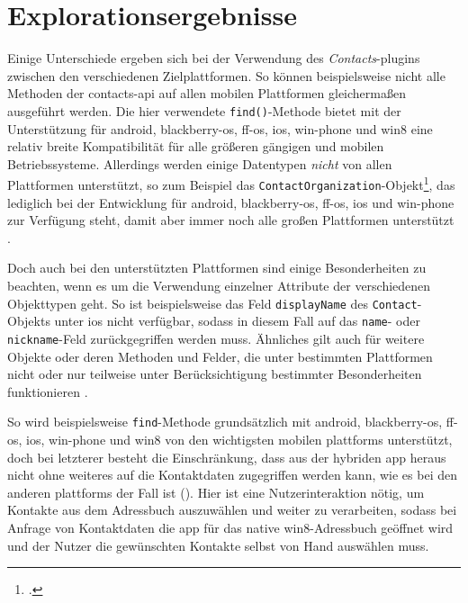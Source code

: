 	\pagebreak
	
\section{Explorationsergebnisse} \label{sec:contacts-ergebnis}
Einige Unterschiede ergeben sich bei der Verwendung des \emph{Contacts}-\glspl{plugin} zwischen den verschiedenen Zielplattformen.
So können beispielsweise nicht alle Methoden der \gls{contacts-api} auf allen mobilen Plattformen gleichermaßen ausgeführt werden.
Die hier verwendete \lstinline|find()|-Methode bietet mit der Unterstützung für \gls{android}, \gls{blackberry-os}, \gls{ff-os}, \gls{ios}, \gls{win-phone} und \gls{win8} eine relativ  breite Kompatibilität für alle größeren gängigen und mobilen Betriebssysteme.
Allerdings werden einige Datentypen \emph{nicht} von allen Plattformen unterstützt, so zum Beispiel das \lstinline|ContactOrganization|-Objekt\footnote{.}, das lediglich bei der Entwicklung für \gls{android}, \gls{blackberry-os}, \gls{ff-os}, \gls{ios} und \gls{win-phone} zur Verfügung steht, damit aber immer noch alle großen Plattformen unterstützt \cite{Cordova_Plugin_Registry_Contacts}.

Doch auch bei den unterstützten Plattformen sind einige Besonderheiten zu beachten, wenn es um die Verwendung einzelner Attribute der verschiedenen Objekttypen geht.
So ist beispielsweise das Feld \lstinline|displayName| des \lstinline|Contact|-Objekts unter \gls{ios} nicht verfügbar, sodass in diesem Fall auf das \lstinline|name|- oder \lstinline|nickname|-Feld zurückgegriffen werden muss.
Ähnliches gilt auch für weitere Objekte oder deren Methoden und Felder, die unter bestimmten Plattformen nicht oder nur teilweise unter Berücksichtigung bestimmter Besonderheiten funktionieren \cite{Cordova_Plugin_Registry_Contacts}.

So wird beispielsweise \lstinline|find|-Methode grundsätzlich mit \gls{android}, \gls{blackberry-os}, \gls{ff-os}, \gls{ios}, \gls{win-phone} und \gls{win8} von den wichtigsten mobilen \glspl{plattform} unterstützt, doch bei letzterer besteht die Einschränkung, dass aus der hybriden \gls{app} heraus nicht ohne weiteres auf die Kontaktdaten zugegriffen werden kann, wie es bei den anderen \glspl{plattform} der Fall ist (\so). Hier ist eine Nutzerinteraktion nötig, um Kontakte aus dem Adressbuch auszuwählen und weiter zu verarbeiten, sodass bei Anfrage von Kontaktdaten die \gls{app} für das native \gls{win8}-Adressbuch geöffnet wird und der Nutzer die gewünschten Kontakte selbst von Hand auswählen muss.

